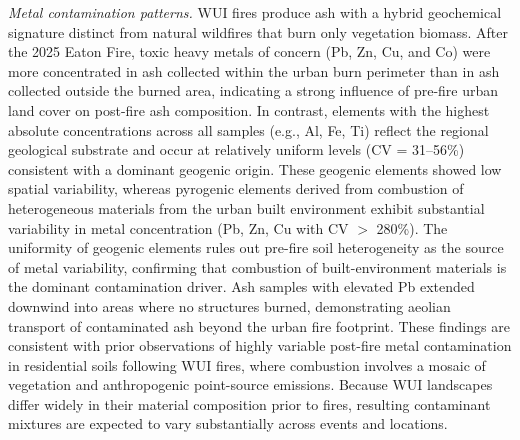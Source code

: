 \documentclass[
  journal=esthag,        %
  manuscript=article,    %
  layout=onecolumn       %
]{achemso}
\begin{document}
\textit{Metal contamination patterns.}
WUI fires produce ash with a hybrid geochemical signature distinct from natural wildfires that burn only vegetation biomass.\cite{pereira2010heavymetals,etiegni1991woodash,sanchezgarcia2023ashchemistry} After the 2025 Eaton Fire, toxic heavy metals of concern (Pb, Zn, Cu, and Co) were more concentrated in ash collected within the urban burn perimeter than in ash collected outside the burned area, indicating a strong influence of pre-fire urban land cover on post-fire ash composition. In contrast, elements with the highest absolute concentrations across all samples (e.g., Al, Fe, Ti) reflect the regional geological substrate and occur at relatively uniform levels (CV = 31--56\%) consistent with a dominant geogenic origin. These geogenic elements showed low spatial variability, whereas pyrogenic elements derived from combustion of heterogeneous materials from the urban built environment exhibit substantial variability in metal concentration (Pb, Zn, Cu with CV $>$ 280\%). The uniformity of geogenic elements rules out pre-fire soil heterogeneity as the source of metal variability, confirming that combustion of built-environment materials is the dominant contamination driver. Ash samples with elevated Pb extended downwind into areas where no structures burned, demonstrating aeolian transport of contaminated ash beyond the urban fire footprint. These findings are consistent with prior observations of highly variable post-fire metal contamination in residential soils following WUI fires, where combustion involves a mosaic of vegetation and anthropogenic point-source emissions.\cite{jech2024marshall,villarruel2024bioaccessible,abraham2017postfire,fernandezmarcos2022toxics} Because WUI landscapes differ widely in their material composition prior to fires, resulting contaminant mixtures are expected to vary substantially across events and locations.
\end{document}
